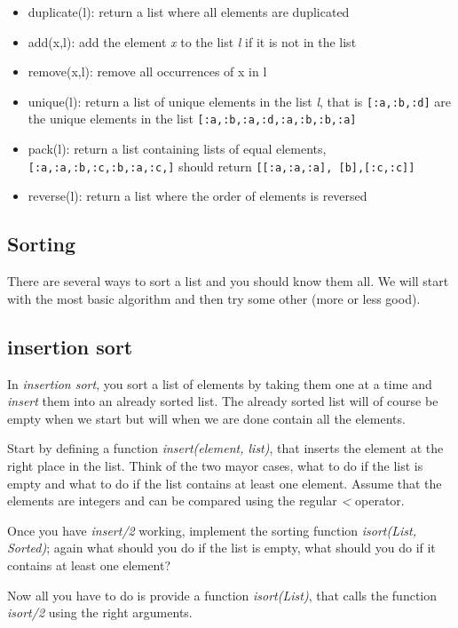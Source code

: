 \documentclass[a4paper,11pt]{article}
\begin{document}
\begin{itemize}
\item duplicate(l): return a list where all elements are duplicated
\item add(x,l): add the element {\em x} to the list {\em l} if it is not in the list
\item remove(x,l): remove all occurrences of x in l 
\item unique(l): return a list of unique elements in the list {\em l},
  that is {\tt [:a,:b,:d]} are the unique elements in the list {\tt [:a,:b,:a,:d,:a,:b,:b,:a]}
\item pack(l): return a list containing lists of equal elements, {\tt
  [:a,:a,:b,:c,:b,:a,:c,]} should return {\tt [[:a,:a,:a], [b],[:c,:c]]}
\item reverse(l): return a list where the order of elements is reversed
\end{itemize}



\subsection{Sorting}

There are several ways to sort a list and you should know them all. We
will start with the most basic algorithm and then try some other (more or less good).

\subsection{insertion sort}

In {\em insertion sort}, you sort a list of elements by taking them
one at a time and {\em insert} them into an already sorted list. The
already sorted list will of course be empty when we start but will
when we are done contain all the elements.

Start by defining a function {\em insert(element, list)}, that inserts
the element at the right place in the list. Think of the two mayor
cases, what to do if the list is empty and what to do if the list
contains at least one element. Assume that the elements are integers
and can be compared using the regular {\em <} operator.


Once you have {\em insert/2} working, implement the sorting function
{\em isort(List, Sorted)}; again what should you do if the list is
empty, what should you do if it contains at least one element?

Now all you have to do is provide a function {\em isort(List)}, that
calls the function {\em isort/2} using the right arguments.
\end{document}
